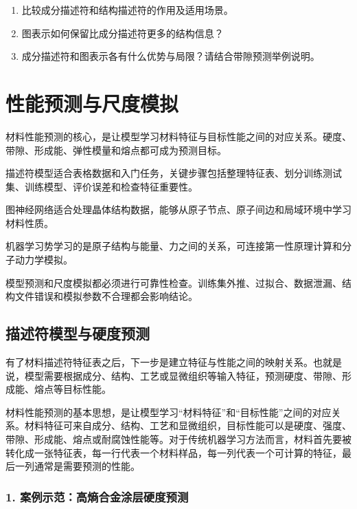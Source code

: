 \begin{enumerate}[leftmargin=*]
\item 比较成分描述符和结构描述符的作用及适用场景。
\item 图表示如何保留比成分描述符更多的结构信息？
\item 成分描述符和图表示各有什么优势与局限？请结合带隙预测举例说明。
\end{enumerate}

\clearpage
\section{性能预测与尺度模拟}


\begin{sectionkeypoints}
\item 材料性能预测的核心，是让模型学习材料特征与目标性能之间的对应关系。硬度、带隙、形成能、弹性模量和熔点都可成为预测目标。
\item 描述符模型适合表格数据和入门任务，关键步骤包括整理特征表、划分训练测试集、训练模型、评价误差和检查特征重要性。
\item 图神经网络适合处理晶体结构数据，能够从原子节点、原子间边和局域环境中学习材料性质。
\item 机器学习势学习的是原子结构与能量、力之间的关系，可连接第一性原理计算和分子动力学模拟。
\item 模型预测和尺度模拟都必须进行可靠性检查。训练集外推、过拟合、数据泄漏、结构文件错误和模拟参数不合理都会影响结论。
\end{sectionkeypoints}

\subsection{描述符模型与硬度预测}
\label{subsec:descriptor-hardness-prediction}

有了材料描述符特征表之后，下一步是建立特征与性能之间的映射关系。也就是说，模型需要根据成分、结构、工艺或显微组织等输入特征，预测硬度、带隙、形成能、熔点等目标性能。


材料性能预测的基本思想，是让模型学习“材料特征”和“目标性能”之间的对应关系。材料特征可来自成分、结构、工艺和显微组织，目标性能可以是硬度、强度、带隙、形成能、熔点或耐腐蚀性能等。对于传统机器学习方法而言，材料首先要被转化成一张特征表，每一行代表一个材料样品，每一列代表一个可计算的特征，最后一列通常是需要预测的性能。


\subsubsection*{\textbf{1. 案例示范：高熵合金涂层硬度预测}}

